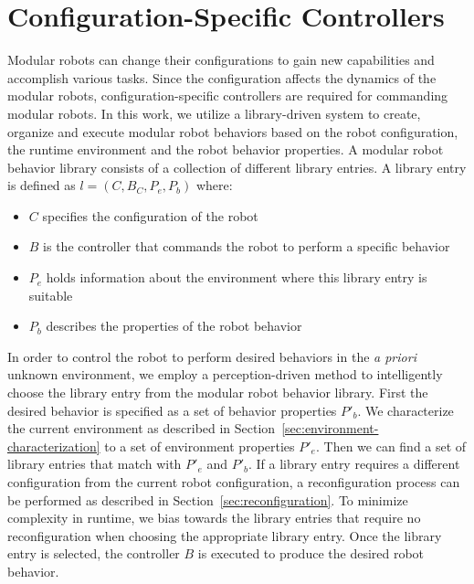 \documentclass[conference]{IEEEtran}
\begin{document}
\section{Configuration-Specific Controllers}
\label{sec:configuration-specifics}
Modular robots can change their configurations to gain new capabilities and accomplish various tasks.
Since the configuration affects the dynamics of the modular robots, configuration-specific controllers are required for commanding modular robots.
In this work, we utilize a library-driven system to create, organize and execute modular robot behaviors based on the robot configuration, the runtime environment and the robot behavior properties.
A modular robot behavior library consists of a collection of different library entries.
A library entry is defined as $l = (C,B_C,P_e,P_b)$ where:
\begin{itemize}
\item $C$ specifies the configuration of the robot
\item $B$ is the controller that commands the robot to perform a specific behavior
\item $P_e$ holds information about the environment where this library entry is suitable
\item $P_b$ describes the properties of the robot behavior
\end{itemize}

In order to control the robot to perform desired behaviors in the \textit{a priori} unknown environment, we employ a perception-driven method to intelligently choose the library entry from the modular robot behavior library.
First the desired behavior is specified as a set of behavior properties $P'_b$.
We characterize the current environment as described in Section~\ref{sec:environment-characterization} to a set of environment properties $P'_e$.
Then we can find a set of library entries that match with $P'_e$ and $P'_b$.
If a library entry requires a different configuration from the current robot configuration, a reconfiguration process can be performed as described in Section~\ref{sec:reconfiguration}.
To minimize complexity in runtime, we bias towards the library entries that require no reconfiguration when choosing the appropriate library entry.
Once the library entry is selected, the controller $B$ is executed to produce the desired robot behavior.
\end{document}
